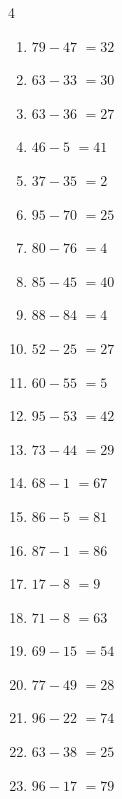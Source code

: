 \begin{multicols}{4}
\begin{enumerate}
  \item $79-47$
        $=32$

  \item $63-33$
        $=30$

  \item $63-36$
        $=27$

  \item $46-5$
        $=41$

  \item $37-35$
        $=2$

  \item $95-70$
        $=25$

  \item $80-76$
        $=4$

  \item $85-45$
        $=40$

  \item $88-84$
        $=4$

  \item $52-25$
        $=27$

  \item $60-55$
        $=5$

  \item $95-53$
        $=42$

  \item $73-44$
        $=29$

  \item $68-1$
        $=67$

  \item $86-5$
        $=81$

  \item $87-1$
        $=86$

  \item $17-8$
        $=9$

  \item $71-8$
        $=63$

  \item $69-15$
        $=54$

  \item $77-49$
        $=28$

  \item $96-22$
        $=74$

  \item $63-38$
        $=25$

  \item $96-17$
        $=79$

\columnbreak %


\end{enumerate}
\end{multicols}
